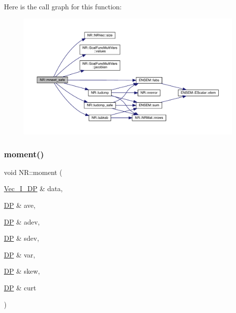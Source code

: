 Here is the call graph for this function\+:
\nopagebreak
\begin{figure}[H]
\begin{center}
\leavevmode
\includegraphics[width=350pt]{da/d46/namespaceNR_a613c01d6d0517310d92cab226cef58bc_cgraph}
\end{center}
\end{figure}
\mbox{\label{namespaceNR_aee3fc839b5ac653eb842a2799391942a}} 
\subsubsection{\texorpdfstring{moment()}{moment()}}
{\footnotesize\ttfamily void N\+R\+::moment (\begin{DoxyParamCaption}\item[{\mbox{\hyperlink{namespaceNR_a9f943da53862537c552e2a770cb170ae}{Vec\+\_\+\+I\+\_\+\+DP}} \&}]{data,  }\item[{\mbox{\hyperlink{namespaceNR_af6ff762dd605ff477b8e52387253a02a}{DP}} \&}]{ave,  }\item[{\mbox{\hyperlink{namespaceNR_af6ff762dd605ff477b8e52387253a02a}{DP}} \&}]{adev,  }\item[{\mbox{\hyperlink{namespaceNR_af6ff762dd605ff477b8e52387253a02a}{DP}} \&}]{sdev,  }\item[{\mbox{\hyperlink{namespaceNR_af6ff762dd605ff477b8e52387253a02a}{DP}} \&}]{var,  }\item[{\mbox{\hyperlink{namespaceNR_af6ff762dd605ff477b8e52387253a02a}{DP}} \&}]{skew,  }\item[{\mbox{\hyperlink{namespaceNR_af6ff762dd605ff477b8e52387253a02a}{DP}} \&}]{curt }\end{DoxyParamCaption})}

\mbox{\label{namespaceNR_ad5e0bc1358051dfcd1c85d1602c4df5a}} 
